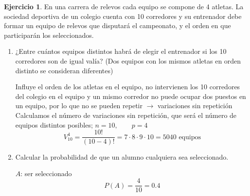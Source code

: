 \documentclass[a4paper, 12pt]{article}
\theoremstyle{definition}
\newtheorem{ej}{Ejercicio}
\begin{document}
\medskip

\begin{ej}
En una carrera de relevos cada equipo se compone de 4 atletas. La sociedad deportiva de un colegio cuenta con 10 corredores y su entrenador debe formar un equipo de relevos que disputará el
campeonato, y el orden en que participarán los seleccionados.
\begin{enumerate}[label=\textit{\alph*)}]
\item ¿Entre cuántos equipos distintos habrá de elegir el entrenador si los 10 corredores son de
igual valía? (Dos equipos con los mismos atletas en orden distinto se consideran diferentes)

\medskip

Influye el orden de los atletas en el equipo, no intervienen los 10 corredores del colegio en el equipo y un mismo corredor no puede ocupar dos puestos en un equipo, por lo que no se pueden repetir $\longrightarrow$ variaciones sin repetición \\
Calculamos el número de variaciones sin repetición, que será el número de equipos distintos posibles; $n = 10,\qquad p = 4$
\[V^4_{10} = \frac{10!}{(10-4)!} = 7\cdot8\cdot9\cdot10 = 5040\text{  equipos}\]
\item Calcular la probabilidad de que un alumno cualquiera sea seleccionado.

\medskip

$A$: ser seleccionado
\[P(A) = \frac{4}{10} = 0.4\]

\end{enumerate}
\end{ej}

\medskip
\end{document}
